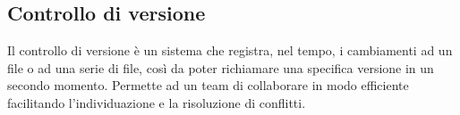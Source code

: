 \subsection*{Controllo di versione}
Il controllo di versione è un sistema che registra, nel tempo, i cambiamenti ad un file o ad una serie di file, così da poter richiamare una specifica versione in un secondo momento.
Permette ad un team di collaborare in modo efficiente facilitando l'individuazione e la risoluzione di conflitti.








